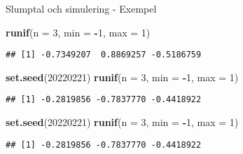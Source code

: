 \documentclass[
  11pt,
  ignorenonframetext,
  handout]{beamer}
\newenvironment{Shaded}{\begin{snugshade}}{\end{snugshade}}
\newcommand{\AttributeTok}[1]{\textcolor[rgb]{0.13,0.29,0.53}{#1}}
\newcommand{\DecValTok}[1]{\textcolor[rgb]{0.00,0.00,0.81}{#1}}
\newcommand{\FunctionTok}[1]{\textcolor[rgb]{0.13,0.29,0.53}{\textbf{#1}}}
\newcommand{\NormalTok}[1]{#1}
\newcommand{\SpecialCharTok}[1]{\textcolor[rgb]{0.81,0.36,0.00}{\textbf{#1}}}
\begin{document}
\begin{frame}[fragile]{Slumptal och simulering - Exempel}
\label{slumptal-och-simulering---exempel}
\begin{Shaded}
\begin{Highlighting}[]
\FunctionTok{runif}\NormalTok{(}\AttributeTok{n =} \DecValTok{3}\NormalTok{, }\AttributeTok{min =} \SpecialCharTok{{-}}\DecValTok{1}\NormalTok{, }\AttributeTok{max =} \DecValTok{1}\NormalTok{)}
\end{Highlighting}
\end{Shaded}

\pause

\begin{verbatim}
## [1] -0.7349207  0.8869257 -0.5186759
\end{verbatim}

\pause

\begin{Shaded}
\begin{Highlighting}[]
\FunctionTok{set.seed}\NormalTok{(}\DecValTok{20220221}\NormalTok{)}
\FunctionTok{runif}\NormalTok{(}\AttributeTok{n =} \DecValTok{3}\NormalTok{, }\AttributeTok{min =} \SpecialCharTok{{-}}\DecValTok{1}\NormalTok{, }\AttributeTok{max =} \DecValTok{1}\NormalTok{)}
\end{Highlighting}
\end{Shaded}

\pause

\begin{verbatim}
## [1] -0.2819856 -0.7837770 -0.4418922
\end{verbatim}

\pause

\begin{Shaded}
\begin{Highlighting}[]
\FunctionTok{set.seed}\NormalTok{(}\DecValTok{20220221}\NormalTok{)}
\FunctionTok{runif}\NormalTok{(}\AttributeTok{n =} \DecValTok{3}\NormalTok{, }\AttributeTok{min =} \SpecialCharTok{{-}}\DecValTok{1}\NormalTok{, }\AttributeTok{max =} \DecValTok{1}\NormalTok{)}
\end{Highlighting}
\end{Shaded}

\pause

\begin{verbatim}
## [1] -0.2819856 -0.7837770 -0.4418922
\end{verbatim}
\end{frame}
\end{document}
